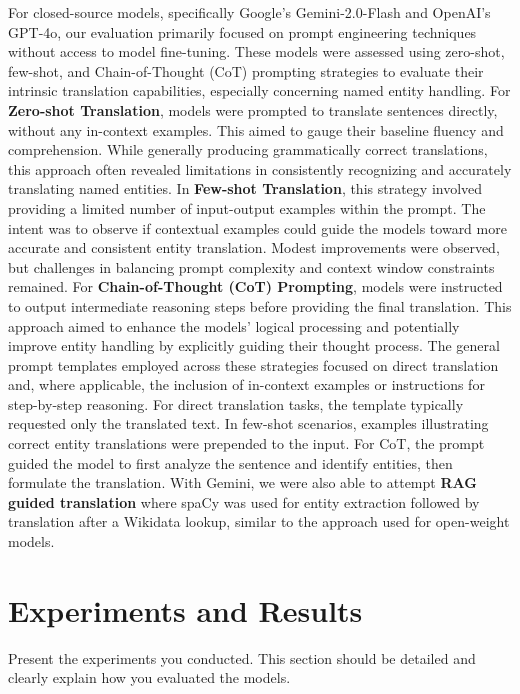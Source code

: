 \documentclass{ecai}
\begin{document}
For closed-source models, specifically Google's Gemini-2.0-Flash and OpenAI's GPT-4o, 
our evaluation primarily focused on prompt engineering techniques without access to model fine-tuning. 
These models were assessed using zero-shot, few-shot, and Chain-of-Thought (CoT) prompting strategies to 
evaluate their intrinsic translation capabilities, especially concerning named entity handling.
For \textbf{Zero-shot Translation}, models were prompted to translate sentences directly, without 
any in-context examples. This aimed to gauge their baseline fluency and comprehension. While generally 
producing grammatically correct translations, this approach often revealed limitations in consistently 
recognizing and accurately translating named entities. In \textbf{Few-shot Translation}, this strategy 
involved providing a limited number of input-output examples within the prompt. 
The intent was to observe if contextual examples could guide the models toward more accurate and consistent entity translation. 
Modest improvements were observed, but challenges in balancing prompt complexity and context window constraints remained. 
For \textbf{Chain-of-Thought (CoT) Prompting}, models were instructed to output intermediate reasoning steps before 
providing the final translation. This approach aimed to enhance the models' logical processing and 
potentially improve entity handling by explicitly guiding their thought process. The general prompt templates 
employed across these strategies focused on direct translation and, where applicable, 
the inclusion of in-context examples or instructions for step-by-step reasoning. 
For direct translation tasks, the template typically requested only the translated text.
In few-shot scenarios, examples illustrating correct entity translations were prepended to the input. 
For CoT, the prompt guided the model to first analyze the sentence and identify entities, then formulate the translation.
With Gemini, we were also able to attempt \textbf{RAG guided translation} where spaCy was used for entity extraction 
followed by translation after a Wikidata lookup, similar to the approach used for open-weight models.


\section{Experiments and Results}
\label{sec:experiments}
Present the experiments you conducted. This section should be detailed and clearly explain how you evaluated the models.
\end{document}
